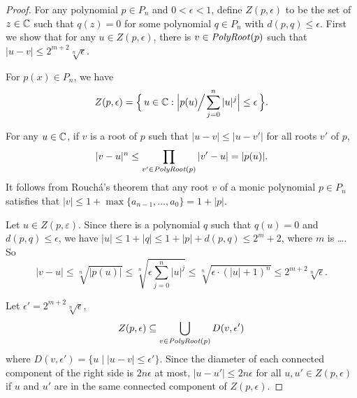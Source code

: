\documentclass[envcountsame,orivec,oribibl]{llncs}
\begin{document}
\begin{proof}
For any polynomial $p \in P_n$ and $0 < \epsilon < 1$, 
define $Z(p, \epsilon)$ to be the set of $z \in \mathbb C$
such that $q(z) = 0$ 
for some polynomial $q \in P_n$ with $d(p, q) \le \epsilon$. 
First we show that for any $u \in Z(p, \epsilon)$, there is $v \in \mathit{PolyRoot}(p)$ such that $|u - v| \le 2^{m+2}\sqrt[n]{\epsilon}$.
\begin{theorem} 
\label{theorem: root neighborhoods 1}
 For $p(x) \in P_n$, we have
 \begin{equation}
  Z(p, \epsilon) = \Bigl\{\, u \in \mathbb C : \Bigl| p(u) \!\!\Bigm/\! \sum _{j=0} ^n |u|^j \Bigr| \le \epsilon \,\Bigr\}. 
 \end{equation}
\end{theorem}
For any $u \in \mathbb C$, if $v$ is a root of $p$ such that 
$|u - v| \le |u - v'|$ for all roots $v'$ of $p$,
\begin{equation}
 |v - u|^n
 \le \prod_{v' \in \mathit{PolyRoot}(p)} |v' - u|
 = |p(u)|.
\end{equation}
It follows from  Rouch\'a's theorem that
any root $v$ of a monic polynomial $p \in P_n$ satisfies that
$|v| \le 1 + \max\{a_{n-1}, \dots, a_0\} = 1 + |p|$.

Let $u \in Z (p, \varepsilon)$. 
Since there is a polynomial $q$ such that $q(u)=0$ and $d(p, q) \le \epsilon$,
we have $|u| \le 1+|q| \le 1 + |p| + d(p, q) \le 2^m + 2$, 
where $m$ is \ldots. %
So
\begin{equation}
 |v - u|
 \le
 \sqrt[n]{|p(u)|}
 \le
 \sqrt[n]{\epsilon \sum_{j=0}^n |u|^j}
 \le
 \sqrt[n]{\epsilon \cdot (|u|+1)^n}
 \le
 2^{m+2} \sqrt[n]{\epsilon}.
\end{equation}


Let $\epsilon' = 2^{m+2} \sqrt[n]{\epsilon}$,
\begin{equation}
 Z(p, \epsilon) \subseteq \bigcup_{v \in \mathit{PolyRoot}(p)} D(v, \epsilon')
\end{equation}
where $D(v, \epsilon') = \{u \mid |u - v| \le \epsilon'\}$.
Since the diameter of each connected component of the right side 
is $2n\epsilon$ at most, $|u - u'| \le 2n\epsilon$ for all 
$u, u' \in Z(p, \epsilon)$ if $u$ and $u'$ are in the same connected component
of $Z(p, \epsilon)$.


\end{proof}
\end{document}
